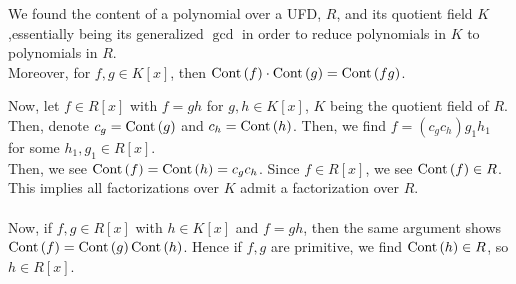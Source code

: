 
\begin{recall}
	We found the content of a polynomial over a UFD, \(R\), and its quotient field \(K\),essentially being its generalized \(\gcd\) in order to reduce polynomials in \(K\) to polynomials in \(R\).\\
	Moreover, for \(f, g \in K\left[ x \right] \), then \(\operatorname{Cont}\left( f \right) \cdot \operatorname{Cont}\left( g \right) = \operatorname{Cont}\left( fg \right)  \).
\end{recall}
Now, let \(f \in R\left[ x \right] \) with \(f = gh\) for \(g, h \in K\left[ x \right] \), \(K\) being the quotient field of \(R\). Then, denote \(c_g = \operatorname{Cont}\left( g \right) \) and \(c_{h}= \operatorname{Cont}\left( h \right) \). Then, we find \(f = \left( c_{g}c_{h} \right) g_1 h_1 \) for some \(h_1, g_1 \in R\left[ x \right] \).\\
Then, we see \(\operatorname{Cont}\left( f \right)  = \operatorname{Cont}\left( h \right) = c_{g}c_{h}\). Since \(f \in R\left[ x \right] \), we see \(\operatorname{Cont}\left( f \right)  \in R\). This implies all factorizations over \(K\) admit a factorization over \(R\).\\
\\
Now, if \(f, g \in R\left[ x \right] \) with \(h \in K\left[ x \right] \) and \(f = gh\), then the same argument shows \(\operatorname{Cont}\left( f \right) = \operatorname{Cont}\left( g \right) \operatorname{Cont}\left( h \right) \). Hence if \(f, g\) are primitive, we find \(\operatorname{Cont}\left( h \right)  \in R\), so \(h \in R\left[ x \right] \).

